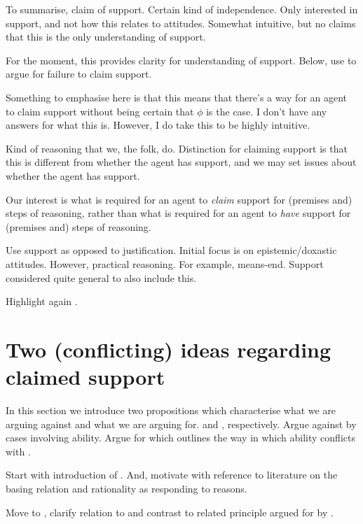 \begin{note}
  To summarise, claim of support.
  Certain kind of independence.
  Only interested in support, and not how this relates to attitudes.
  Somewhat intuitive, but no claims that this is the only understanding of support.

  For the moment, this provides clarity for understanding of support.
  Below, use to argue for failure to claim support.
\end{note}

\begin{note}
  \color{red}
  Something to emphasise here is that this means that there's a way for an agent to claim support without being certain that \(\phi\) is the case.
  I don't have any answers for what this is.
  However, I do take this to be highly intuitive.
\end{note}


\begin{note}[Adequate]
  Kind of reasoning that we, the folk, do.
  Distinction for claiming support is that this is different from whether the agent has support, and we may set issues about whether the agent has support.

  Our interest is what is required for an agent to \emph{claim} support for (premises and) steps of reasoning, rather than what is required for an agent to \emph{have} support for (premises and) steps of reasoning.

  Use support as opposed to justification.
  Initial focus is on epistemic/doxastic attitudes.
  However, practical reasoning.
  For example, means-end.
  Support considered quite general to also include this.
\end{note}

\begin{note}
  Highlight again .
\end{note}

\section{Two (conflicting) ideas regarding claimed support}
\label{sec:inter-with-claim}

\begin{note}
  In this section we introduce two propositions which characterise what we are arguing against and what we are arguing for.
  \ESU{-} and \EAS{-}, respectively.
  Argue against \ESU{} by cases involving ability.
  Argue for \EAS{} which outlines the way in which ability conflicts with \ESU{}.

  Start with introduction of \ESU{}.
  And, motivate with reference to literature on the basing relation and rationality as responding to reasons.

  Move to \EAS{}, clarify relation to \ESU{} and contrast to related principle argued for by \citeauthor{Moretti:2019wx}.
\end{note}

